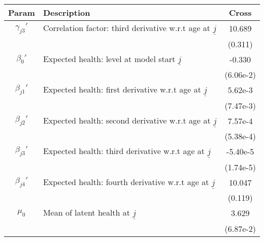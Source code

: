 \begin{table}[ht]\label{CrossWomenHealthParams}
\footnotesize
\begin{center}
\begin{tabular}{clc}
\hline \hline
Param & Description & Cross \\
\hline
$\gamma_{j3}'$ & Correlation factor: third derivative w.r.t age at $\underline{j}$ & 10.689 \\
 & & (0.311) \\
$\beta_{0}'$ & Expected health: level at model start $\underline{j}$ & -0.330 \\
 & & (6.06e-2) \\
$\beta_{j1}'$ & Expected health: first derivative w.r.t age at $\underline{j}$ & 5.62e-3 \\
 & & (7.47e-3) \\
$\beta_{j2}'$ & Expected health: second derivative w.r.t age at $\underline{j}$ & 7.57e-4 \\
 & & (5.38e-4) \\
$\beta_{j3}'$ & Expected health: third derivative w.r.t age at $\underline{j}$ & -5.40e-5 \\
 & & (1.74e-5) \\
$\beta_{j4}'$ & Expected health: fourth derivative w.r.t age at $\underline{j}$ & 10.047 \\
 & & (0.119) \\
$\mu_0$ & Mean of latent health at $\underline{j}$ & 3.629 \\
 & & (6.87e-2) \\
\hline\hline
\end{tabular}
\end{center}
\end{table}
